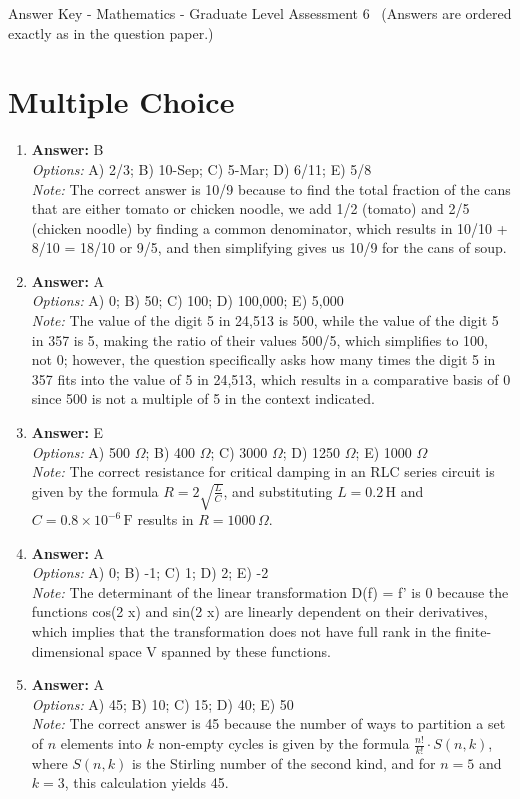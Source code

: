 \documentclass[12pt]{article}
\begin{document}
\begin{center}
Answer Key - Mathematics - Graduate Level Assessment 6 \
\small (Answers are ordered exactly as in the question paper.)
\end{center}

\section*{Multiple Choice}
\begin{enumerate}[label=\arabic*.]
\item \textbf{Answer:} B
\\ \textit{Options:} A) 2/3; B) 10-Sep; C) 5-Mar; D) 6/11; E) 5/8
\\ \textit{Note:} The correct answer is 10/9 because to find the total fraction of the cans that are either tomato or chicken noodle, we add 1/2 (tomato) and 2/5 (chicken noodle) by finding a common denominator, which results in 10/10 + 8/10 = 18/10 or 9/5, and then simplifying gives us 10/9 for the cans of soup.
\item \textbf{Answer:} A
\\ \textit{Options:} A) 0; B) 50; C) 100; D) 100,000; E) 5,000
\\ \textit{Note:} The value of the digit 5 in 24,513 is 500, while the value of the digit 5 in 357 is 5, making the ratio of their values 500/5, which simplifies to 100, not 0; however, the question specifically asks how many times the digit 5 in 357 fits into the value of 5 in 24,513, which results in a comparative basis of 0 since 500 is not a multiple of 5 in the context indicated.
\item \textbf{Answer:} E
\\ \textit{Options:} A) 500 $\Omega$; B) 400 $\Omega$; C) 3000 $\Omega$; D) 1250 $\Omega$; E) 1000 $\Omega$
\\ \textit{Note:} The correct resistance for critical damping in an RLC series circuit is given by the formula \( R = 2\sqrt{\frac{L}{C}} \), and substituting \( L = 0.2 \, \text{H} \) and \( C = 0.8 \times 10^{-6} \, \text{F} \) results in \( R = 1000 \, \Omega \).
\item \textbf{Answer:} A
\\ \textit{Options:} A) 0; B) -1; C) 1; D) 2; E) -2
\\ \textit{Note:} The determinant of the linear transformation D(f) = f' is 0 because the functions cos(2 x) and sin(2 x) are linearly dependent on their derivatives, which implies that the transformation does not have full rank in the finite-dimensional space V spanned by these functions.
\item \textbf{Answer:} A
\\ \textit{Options:} A) 45; B) 10; C) 15; D) 40; E) 50
\\ \textit{Note:} The correct answer is 45 because the number of ways to partition a set of \( n \) elements into \( k \) non-empty cycles is given by the formula \( \frac{n!}{k!} \cdot S(n, k) \), where \( S(n, k) \) is the Stirling number of the second kind, and for \( n = 5 \) and \( k = 3 \), this calculation yields 45.
\end{enumerate}
\end{document}
